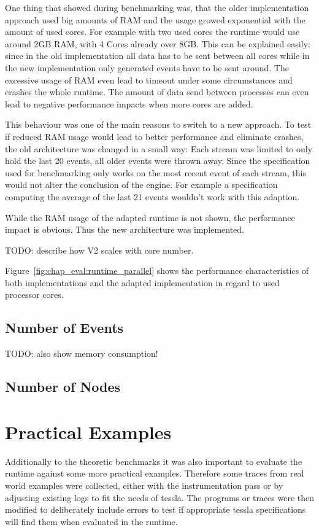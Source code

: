 One thing that showed during benchmarking was, that the older implementation approach used big amounts of RAM and the usage growed exponential with the amount of used cores.
For example with two used cores the runtime would use around 2GB RAM, with 4 Cores already over 8GB.
This can be explained easily: since in the old implementation all data has to be sent between all cores while in the new implementation only generated events have to be sent around.
The excessive usage of RAM even lead to timeout under some circumstances and crashes the whole runtime.
The amount of data send between processes can even lead to negative performance impacts when more cores are added.

This behaviour was one of the main reasons to switch to a new approach.
To test if reduced RAM usage would lead to better performance and eliminate crashes, the old architecture was changed in a small way: Each stream was limited to only hold the last 20 events, all older events were thrown away.
Since the specification used for benchmarking only works on the most recent event of each stream, this would not alter the conclusion of the engine.
For example a specification computing the average of the last 21 events wouldn't work with this adaption.

While the RAM usage of the adapted runtime is not shown, the performance impact is obvious.
Thus the new architecture was implemented.

TODO: describe how V2 scales with core number.

Figure~\ref{fig:chap_eval:runtime_parallel} shows the performance characteristics of both implementations and the adapted implementation in regard to used processor cores.

\subsection{Number of Events}
TODO: also show memory consumption!
\subsection{Number of Nodes}

\section{Practical Examples}
\label{sec:evaluation:runtime_examples}

Additionally to the theoretic benchmarks it was also important to evaluate the runtime against some more practical examples.
Therefore some traces from real world examples were collected, either with the instrumentation pass or by adjusting existing logs to fit the needs of \gls{tessla}.
The programs or traces were then modified to deliberately include errors to test if appropriate \gls{tessla} specifications will find them when evaluated in the runtime.

